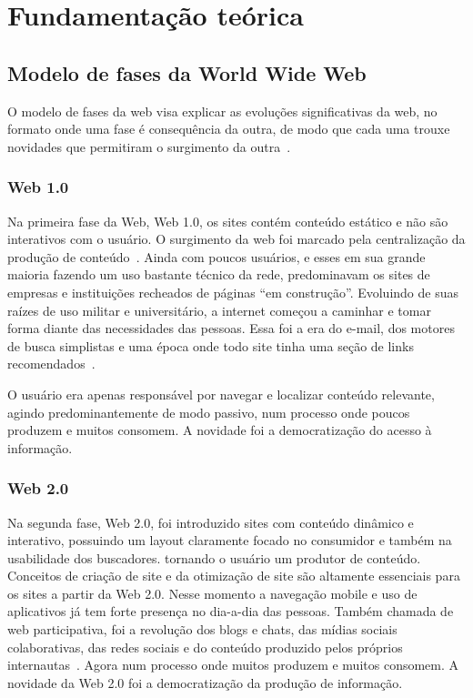 \chapter{Fundamentação teórica}

\section{Modelo de fases da World Wide Web}

O modelo de fases da web visa explicar as evoluções significativas da web, no formato onde uma fase é consequência da outra, de modo que cada uma trouxe novidades que permitiram o surgimento da outra~\cite{Web31}.

\subsection{Web 1.0}

Na primeira fase da Web, Web 1.0, os sites contém conteúdo estático e não são interativos com o usuário.
O surgimento da web foi marcado pela centralização da produção de conteúdo~\cite{Web31}.
Ainda com poucos usuários, e esses em sua grande maioria fazendo um uso bastante técnico da rede, predominavam os sites de empresas e instituições recheados de páginas ``em construção''.
Evoluindo de suas raízes de uso militar e universitário, a internet começou a caminhar e tomar forma diante das necessidades das pessoas.
Essa foi a era do e-mail, dos motores de busca simplistas e uma época onde todo site tinha uma seção de links recomendados~\cite{Web31}.

O usuário era apenas responsável por navegar e localizar conteúdo relevante, agindo predominantemente de modo passivo, num processo onde poucos produzem e muitos consomem.
A novidade foi a democratização do acesso à informação.

\subsection{Web 2.0}

Na segunda fase, Web 2.0, foi introduzido sites com conteúdo dinâmico e interativo, possuindo um layout claramente focado no consumidor e também na usabilidade dos buscadores. tornando o usuário um produtor de conteúdo.
Conceitos de criação de site e da otimização de site são altamente essenciais para os sites a partir da Web 2.0.
Nesse momento a navegação mobile e uso de aplicativos já tem forte presença no dia-a-dia das pessoas.
Também chamada de web participativa, foi a revolução dos blogs e chats, das mídias sociais colaborativas, das redes sociais e do conteúdo produzido pelos próprios internautas~\cite{Web32}.
Agora num processo onde muitos produzem e muitos consomem.
A novidade da Web 2.0 foi a democratização da produção de informação.

